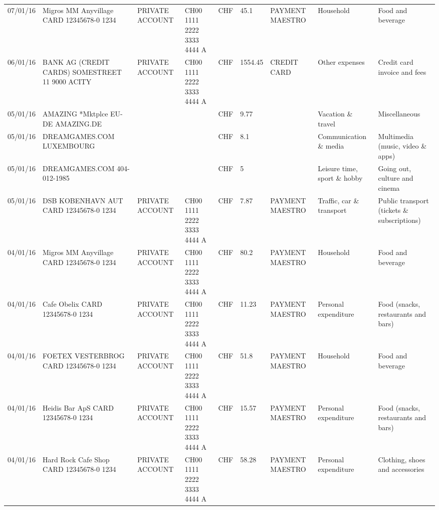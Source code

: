 \begin{landscape}
\begin{table}[t]
\begin{center}
\begin{tabular}{lllllllll}
		07/01/16 & Migros MM Anyvillage CARD 12345678-0 1234 & PRIVATE ACCOUNT & CH00 1111 2222 3333 4444 A & CHF   & 45.1  & PAYMENT MAESTRO & Household & Food and beverage \\
		06/01/16 & BANK AG (CREDIT CARDS) SOMESTREET 11 9000 ACITY & PRIVATE ACCOUNT & CH00 1111 2222 3333 4444 A & CHF   & 1554.45 & CREDIT CARD & Other expenses & Credit card invoice and fees \\
		05/01/16 & AMAZING *Mktplce EU-DE    AMAZING.DE &       &       & CHF   & 9.77  &       & Vacation \& travel & Miscellaneous \\
		05/01/16 & DREAMGAMES.COM           LUXEMBOURG &       &       & CHF   & 8.1   &       & Communication \& media & Multimedia (music, video \& apps) \\
		05/01/16 & DREAMGAMES.COM           404-012-1985 &       &       & CHF   & 5     &       & Leisure time, sport \& hobby & Going out, culture and cinema \\
		05/01/16 & DSB KOBENHAVN AUT CARD 12345678-0 1234 & PRIVATE ACCOUNT & CH00 1111 2222 3333 4444 A & CHF   & 7.87  & PAYMENT MAESTRO & Traffic, car \& transport & Public transport (tickets \& subscriptions) \\
		04/01/16 & Migros MM Anyvillage CARD 12345678-0 1234 & PRIVATE ACCOUNT & CH00 1111 2222 3333 4444 A & CHF   & 80.2  & PAYMENT MAESTRO & Household & Food and beverage \\
		04/01/16 & Cafe Obelix CARD 12345678-0 1234 & PRIVATE ACCOUNT & CH00 1111 2222 3333 4444 A & CHF   & 11.23 & PAYMENT MAESTRO & Personal expenditure & Food (snacks, restaurants and bars) \\
		04/01/16 & FOETEX VESTERBROG CARD 12345678-0 1234 & PRIVATE ACCOUNT & CH00 1111 2222 3333 4444 A & CHF   & 51.8  & PAYMENT MAESTRO & Household & Food and beverage \\
		04/01/16 & Heidis Bar ApS CARD 12345678-0 1234 & PRIVATE ACCOUNT & CH00 1111 2222 3333 4444 A & CHF   & 15.57 & PAYMENT MAESTRO & Personal expenditure & Food (snacks, restaurants and bars) \\
		04/01/16 & Hard Rock Cafe Shop CARD 12345678-0 1234 & PRIVATE ACCOUNT & CH00 1111 2222 3333 4444 A & CHF   & 58.28 & PAYMENT MAESTRO & Personal expenditure & Clothing, shoes and accessories \\
	\end{tabular}%
		\end{center}
	\label{tab:addlabel}%
\end{table}%

\end{landscape}

